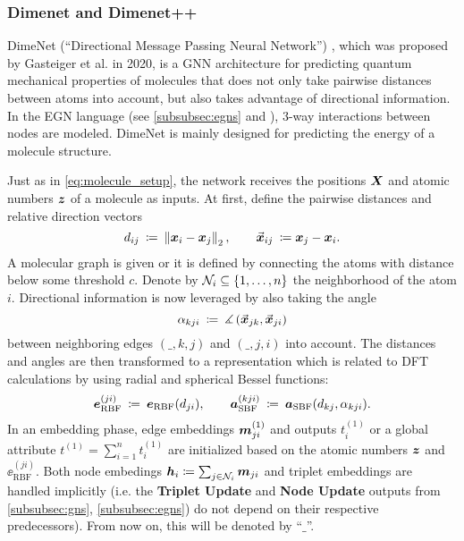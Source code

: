 \subsubsection{Dimenet and Dimenet++}
\label{subsubsec:dimenet}

DimeNet (\enquote{Directional Message Passing Neural Network}) 
\cite{DBLP:journals/corr/abs-2003-03123}, which was proposed by Gasteiger et al. 
in 2020, is a GNN architecture for predicting quantum mechanical properties
of molecules that does not only take pairwise distances between atoms into
account, but also takes advantage of directional information. In the EGN 
language (see \ref{subsubsec:egns} and \cite{https://doi.org/10.48550/arxiv.2203.09697}),
3-way interactions between nodes are modeled. DimeNet is mainly designed for 
predicting the energy of a molecule structure.

Just as in \eqref{eq:molecule_setup}, the network receives the positions $\boldsymbol{X}$
and atomic numbers $\boldsymbol{z}$ of a molecule as inputs. 
At first, define the pairwise distances and relative direction vectors
\[
    d_{ij} \: \coloneqq \: \left\lVert\boldsymbol{x}_i - \boldsymbol{x}_j\right\rVert_2, 
    \qquad \vec{\boldsymbol{x}}_{ij} \: \coloneqq \boldsymbol{x}_j - \boldsymbol{x}_i \text{.}
\]
A molecular graph is given or it is defined by connecting the atoms with distance 
below some threshold $c$. Denote by $\mathcal{N}_i \subseteq \left\{1, \dots, n\right\}$ the 
neighborhood of the atom $i$.
Directional information is now leveraged by also 
taking the angle
\[
    \alpha_{kji} \: \coloneqq \: \measuredangle\left( \vec{\boldsymbol{x}}_{jk}, \vec{\boldsymbol{x}}_{ji} \right)
\]
between neighboring edges $(\_,k,j)$ and $(\_,j,i)$ into account. 
The distances and angles are then transformed to a representation which is related
to DFT calculations \cite[Section 5]{DBLP:journals/corr/abs-2003-03123}
by using radial and spherical Bessel functions:
\[
    \boldsymbol{e}_{\text{RBF}}^{(ji)} \: \coloneqq \: \boldsymbol{e}_{\text{RBF}}(d_{ji}), 
    \qquad \boldsymbol{a}_{\text{SBF}}^{(kji)} \: \coloneqq \: \boldsymbol{a}_{\text{SBF}}(d_{kj}, \alpha_{kji})
    \text{.}
\]
In an embedding phase, edge embeddings $\boldsymbol{m}_{ji}^{(1)}$ and outputs
$t_{i}^{(1)}$ or a global attribute $t^{(1)} = \sum_{i=1}^n t_i^{(1)}$ are initialized based
on the atomic numbers $\boldsymbol{z}$ and $\ee_{\text{RBF}}^{(ji)}$. Both node embedings 
$\boldsymbol{h}_i \coloneqq \sum_{j \in \mathcal{N}_i} \boldsymbol{m}_{ji}$ and triplet embeddings are handled
implicitly (i.e. the \textbf{Triplet Update} and \textbf{Node Update} outputs from 
\ref{subsubsec:gns}, \ref{subsubsec:egns}) do not depend on their respective predecessors).
From now on, this will be denoted by \enquote{$\_$}.

